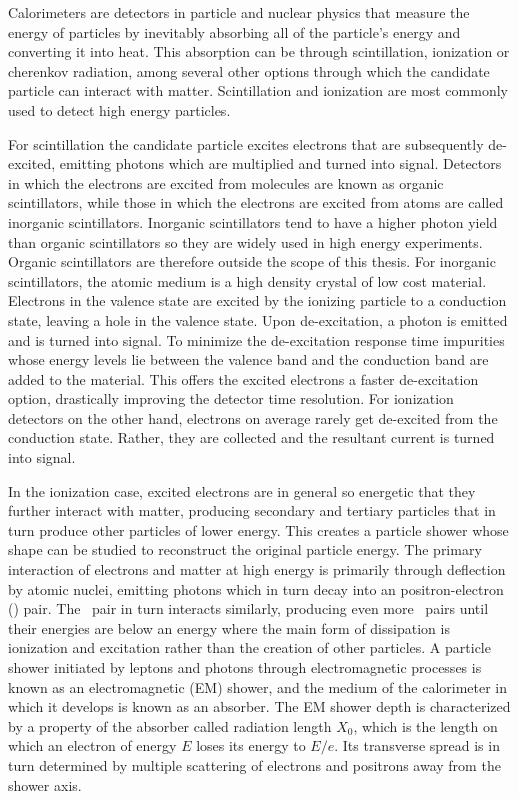 \par Calorimeters are detectors in particle and nuclear physics that measure the
energy of particles by inevitably absorbing all  
of the particle's energy and converting it into heat. This absorption can be through 
scintillation, ionization or cherenkov radiation, among several other options through which  
the candidate particle can interact with matter. Scintillation and ionization are most commonly used to detect 
high energy particles. 

\par For scintillation the candidate particle excites electrons that are subsequently 
de-excited, emitting photons which are multiplied and turned into signal. Detectors 
in which the electrons are excited from molecules are known as organic scintillators, 
while those in which the electrons are excited from atoms are called 
inorganic scintillators. Inorganic scintillators tend to have a higher photon yield than 
organic scintillators so they are widely used in high energy experiments. Organic scintillators 
are therefore outside the scope of this thesis. For inorganic scintillators, 
the atomic medium is a high density crystal of low cost material. Electrons in 
the valence state are excited by the ionizing particle to a conduction state,
 leaving a hole in the valence state. Upon de-excitation, a photon is emitted and 
is turned into signal. To minimize the de-excitation response time impurities whose energy levels lie between 
the valence band and the conduction band are added to the material. This offers the 
excited electrons a faster de-excitation option, drastically improving the detector 
time resolution. For ionization detectors on the other hand, electrons 
on average rarely get de-excited from the conduction state. Rather, they are collected 
and the resultant current is turned into signal.   

\par In the ionization case, excited electrons are in general so energetic that they further interact with matter, 
producing secondary and tertiary particles that in turn produce other particles of lower energy. This creates a 
particle shower whose shape can be studied to reconstruct the original particle energy.
 The primary interaction of electrons and matter at high energy is
primarily through deflection by atomic nuclei, emitting 
photons which in turn decay into an positron-electron (\epem) pair. The \epem\ pair in turn interacts 
similarly, producing even more \epem\ pairs until their energies are below an energy 
where the main form of dissipation is ionization and excitation rather than the 
creation of other particles. A particle shower initiated by leptons and photons through 
electromagnetic processes is known as an electromagnetic (EM) shower, and the medium of the calorimeter 
in which it develops is known as an absorber. The EM shower depth is characterized by 
a property of the absorber called radiation length $X_0$, which is the length on 
which an electron of energy $E$ loses its energy to $E/e$. Its transverse spread is in turn       
determined by multiple scattering of electrons and positrons away from the shower axis.

